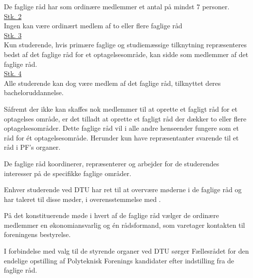 \begin{list}
\item De faglige råd har som ordinære medlemmer et antal på mindst 7 personer.\\

\underline{Stk. 2} \\
Ingen kan være ordinært medlem af to eller flere faglige råd\\

\underline{Stk. 3} \\
Kun studerende, hvis primære faglige og studiemæssige tilknytning repræsenteres bedst af det faglige råd for et optagelsesområde, kan sidde som medlemmer af det faglige råd.\\

\underline{Stk. 4} \\ 
Alle studerende kan dog være medlem af det faglige råd, tilknyttet deres bacheloruddannelse.\\

\item Såfremt der ikke kan skaffes nok medlemmer til at oprette et fagligt råd for et optagelses område, er det tilladt at oprette et fagligt råd der dækker to eller flere optagelsesområder. Dette faglige råd vil i alle andre henseender fungere som et råd for ét optagelsesområde. Herunder kun have repræsentanter svarende til et råd i PF’s organer.\\

\item De faglige råd koordinerer, repræsenterer og arbejder for de studerendes interesser på de specifikke faglige områder.\\

\item Enhver studerende ved DTU har ret til at overvære møderne i de faglige råd og har taleret til disse møder, i overensstemmelse med .\\

\item På det konstituerende møde i hvert af de faglige råd vælger de ordinære medlemmer en økonomiansvarlig og én rådsformand, som varetager kontakten til foreningens bestyrelse.\\

\item \label{L:faglige:DTUvalg} I forbindelse med valg til de styrende organer ved DTU sørger Fællesrådet for den endelige opstilling af Polyteknisk Forenings kandidater efter indstilling fra de faglige råd.\\


\end{list}
